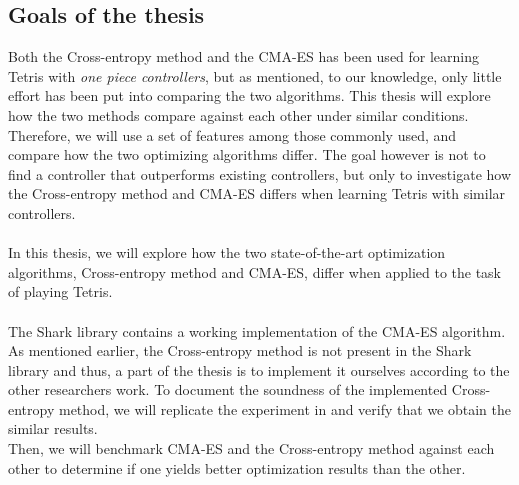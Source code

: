 \subsection{Goals of the thesis}

Both the Cross-entropy method and the CMA-ES has been used 
for learning Tetris with \textit{one piece controllers}, but as 
mentioned, to our knowledge, only little effort has been put into 
comparing the two algorithms. This thesis will explore
how the two methods compare against each other under similar
conditions. Therefore, we will use a set of features among those
commonly used, and compare how the two optimizing algorithms 
differ. The goal however is not to find a controller that 
outperforms existing controllers, but only to investigate 
how the Cross-entropy method and CMA-ES differs when learning Tetris
with similar controllers.\\
\\
In this thesis, we will explore how the two state-of-the-art
optimization algorithms, Cross-entropy method and CMA-ES, differ when 
applied to the task of playing Tetris.\\
\\
The Shark library \citep{shark08} contains a
working implementation of the CMA-ES 
algorithm. As mentioned earlier, the Cross-entropy method 
is not present in the Shark library and thus, 
a part of the thesis is to implement it ourselves according to 
the other researchers work. To document the 
soundness of the implemented Cross-entropy method, 
we will replicate the experiment in \citep{thiery:09} and 
verify that we obtain the similar results.\\
Then, we will benchmark CMA-ES and the Cross-entropy method against each other 
to determine if one yields better optimization results than the other.
